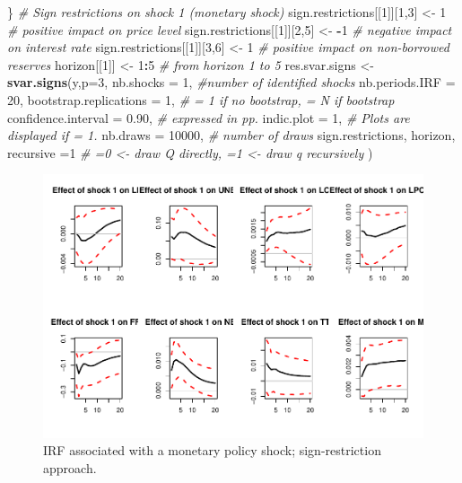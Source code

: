\documentclass[
  12pt,
]{book}
\newenvironment{Shaded}{\begin{snugshade}}{\end{snugshade}}
\newcommand{\AttributeTok}[1]{\textcolor[rgb]{0.13,0.29,0.53}{#1}}
\newcommand{\CommentTok}[1]{\textcolor[rgb]{0.56,0.35,0.01}{\textit{#1}}}
\newcommand{\DecValTok}[1]{\textcolor[rgb]{0.00,0.00,0.81}{#1}}
\newcommand{\FloatTok}[1]{\textcolor[rgb]{0.00,0.00,0.81}{#1}}
\newcommand{\FunctionTok}[1]{\textcolor[rgb]{0.13,0.29,0.53}{\textbf{#1}}}
\newcommand{\NormalTok}[1]{#1}
\newcommand{\OtherTok}[1]{\textcolor[rgb]{0.56,0.35,0.01}{#1}}
\newcommand{\SpecialCharTok}[1]{\textcolor[rgb]{0.81,0.36,0.00}{\textbf{#1}}}
\theoremstyle{definition}
\theoremstyle{definition}
\theoremstyle{definition}
\theoremstyle{definition}
\theoremstyle{remark}
\begin{document}
\begin{Shaded}
\begin{Highlighting}[]
\NormalTok{\}}
\CommentTok{\# Sign restrictions on shock 1 (monetary shock)}
\NormalTok{sign.restrictions[[}\DecValTok{1}\NormalTok{]][}\DecValTok{1}\NormalTok{,}\DecValTok{3}\NormalTok{] }\OtherTok{\textless{}{-}} \DecValTok{1}  \CommentTok{\# positive impact on price level}
\NormalTok{sign.restrictions[[}\DecValTok{1}\NormalTok{]][}\DecValTok{2}\NormalTok{,}\DecValTok{5}\NormalTok{] }\OtherTok{\textless{}{-}} \SpecialCharTok{{-}}\DecValTok{1} \CommentTok{\# negative impact on interest rate}
\NormalTok{sign.restrictions[[}\DecValTok{1}\NormalTok{]][}\DecValTok{3}\NormalTok{,}\DecValTok{6}\NormalTok{] }\OtherTok{\textless{}{-}} \DecValTok{1} \CommentTok{\# positive impact on non{-}borrowed reserves}
\NormalTok{horizon[[}\DecValTok{1}\NormalTok{]] }\OtherTok{\textless{}{-}} \DecValTok{1}\SpecialCharTok{:}\DecValTok{5} \CommentTok{\# from horizon 1 to 5}
\NormalTok{res.svar.signs }\OtherTok{\textless{}{-}} 
  \FunctionTok{svar.signs}\NormalTok{(y,}\AttributeTok{p=}\DecValTok{3}\NormalTok{,}
             \AttributeTok{nb.shocks =} \DecValTok{1}\NormalTok{, }\CommentTok{\#number of identified shocks}
             \AttributeTok{nb.periods.IRF =} \DecValTok{20}\NormalTok{,}
             \AttributeTok{bootstrap.replications =} \DecValTok{1}\NormalTok{, }\CommentTok{\# = 1 if no bootstrap, = N if bootstrap}
             \AttributeTok{confidence.interval =} \FloatTok{0.90}\NormalTok{, }\CommentTok{\# expressed in pp.}
             \AttributeTok{indic.plot =} \DecValTok{1}\NormalTok{, }\CommentTok{\# Plots are displayed if = 1.}
             \AttributeTok{nb.draws =} \DecValTok{10000}\NormalTok{, }\CommentTok{\# number of draws}
\NormalTok{             sign.restrictions,}
\NormalTok{             horizon,}
             \AttributeTok{recursive =}\DecValTok{1} \CommentTok{\#  =0 \textless{}{-} draw Q directly, =1 \textless{}{-} draw q recursively}
\NormalTok{  )}
\end{Highlighting}
\end{Shaded}

\begin{figure}
\includegraphics[width=0.95\linewidth]{IdentifStructShocks_files/figure-latex/signrestr1-1} \caption{IRF associated with a monetary policy shock; sign-restriction approach.}\label{fig:signrestr1}
\end{figure}
\end{document}
